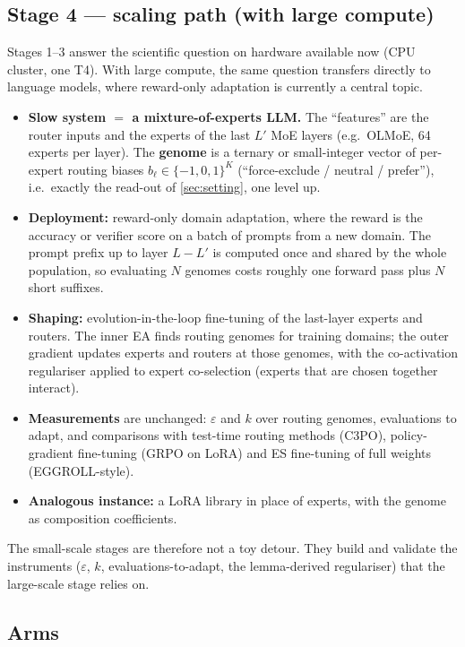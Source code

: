 \documentclass[11pt,a4paper]{article}
\theoremstyle{definition}
\theoremstyle{plain}
\theoremstyle{remark}
\begin{document}
\subsection{Stage 4 --- scaling path (with large compute)}
\label{sec:scaling}
Stages 1--3 answer the scientific question on hardware available now (CPU cluster, one T4). With large compute, the same question transfers directly to language models, where reward-only adaptation is currently a central topic.
\begin{itemize}
\item \textbf{Slow system $=$ a mixture-of-experts LLM.} The ``features'' are the router inputs and the experts of the last $L'$ MoE layers (e.g.\ OLMoE, 64 experts per layer). The \textbf{genome} is a ternary or small-integer vector of per-expert routing biases $b_\ell\in\{-1,0,1\}^{K}$ (``force-exclude / neutral / prefer''), i.e.\ exactly the read-out of \cref{sec:setting}, one level up.
\item \textbf{Deployment:} reward-only domain adaptation, where the reward is the accuracy or verifier score on a batch of prompts from a new domain. The prompt prefix up to layer $L-L'$ is computed once and shared by the whole population, so evaluating $N$ genomes costs roughly one forward pass plus $N$ short suffixes.
\item \textbf{Shaping:} evolution-in-the-loop fine-tuning of the last-layer experts and routers. The inner EA finds routing genomes for training domains; the outer gradient updates experts and routers at those genomes, with the co-activation regulariser applied to expert co-selection (experts that are chosen together interact).
\item \textbf{Measurements} are unchanged: $\varepsilon$ and $k$ over routing genomes, evaluations to adapt, and comparisons with test-time routing methods (C3PO), policy-gradient fine-tuning (GRPO on LoRA) and ES fine-tuning of full weights (EGGROLL-style).
\item \textbf{Analogous instance:} a LoRA library in place of experts, with the genome as composition coefficients.
\end{itemize}
The small-scale stages are therefore not a toy detour. They build and validate the instruments ($\varepsilon$, $k$, evaluations-to-adapt, the lemma-derived regulariser) that the large-scale stage relies on.

\subsection{Arms}
\end{document}
